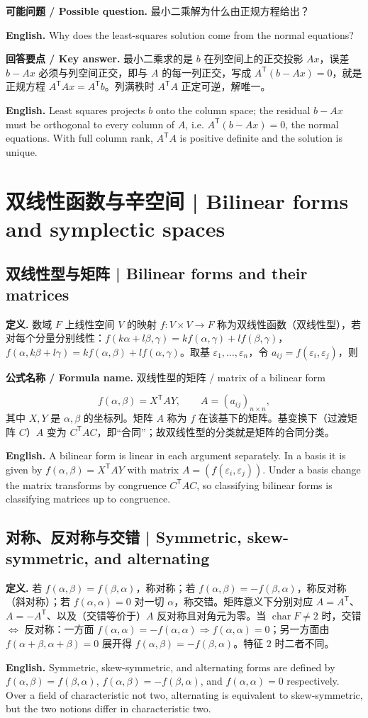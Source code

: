 \documentclass[UTF8,11pt,a4paper]{ctexart}
\newcommand{\EN}[1]{\par\noindent\textbf{English.} #1\par}
\newcommand{\FORMULA}[2]{\par\noindent\textbf{公式名称 / Formula name.} #1 / #2\par}
\newcommand{\ASK}[4]{\par\noindent\textbf{可能问题 / Possible question.} #1\par\EN{#2}\noindent\textbf{回答要点 / Key answer.} #3\par\EN{#4}\medskip}
\begin{document}
\ASK{最小二乘解为什么由正规方程给出？}{Why does the least-squares solution come from the normal equations?}{最小二乘求的是 $b$ 在列空间上的正交投影 $Ax$，误差 $b-Ax$ 必须与列空间正交，即与 $A$ 的每一列正交，写成 $A^{\mathsf T}(b-Ax)=0$，就是正规方程 $A^{\mathsf T}Ax=A^{\mathsf T}b$。列满秩时 $A^{\mathsf T}A$ 正定可逆，解唯一。}{Least squares projects $b$ onto the column space; the residual $b-Ax$ must be orthogonal to every column of $A$, i.e. $A^{\mathsf T}(b-Ax)=0$, the normal equations. With full column rank, $A^{\mathsf T}A$ is positive definite and the solution is unique.}

\section{双线性函数与辛空间 | Bilinear forms and symplectic spaces}
\subsection{双线性型与矩阵 | Bilinear forms and their matrices}
\noindent\textbf{定义.} 数域 $F$ 上线性空间 $V$ 的映射 $f:V\times V\to F$ 称为双线性函数（双线性型），若对每个分量分别线性：$f(k\alpha+l\beta,\gamma)=kf(\alpha,\gamma)+lf(\beta,\gamma)$，$f(\alpha,k\beta+l\gamma)=kf(\alpha,\beta)+lf(\alpha,\gamma)$。取基 $\varepsilon_1,\dots,\varepsilon_n$，令 $a_{ij}=f(\varepsilon_i,\varepsilon_j)$，则
\FORMULA{双线性型的矩阵}{matrix of a bilinear form}
\[
f(\alpha,\beta)=X^{\mathsf T}AY,\qquad A=(a_{ij})_{n\times n},
\]
其中 $X,Y$ 是 $\alpha,\beta$ 的坐标列。矩阵 $A$ 称为 $f$ 在该基下的矩阵。基变换下（过渡矩阵 $C$）$A$ 变为 $C^{\mathsf T}AC$，即“合同”；故双线性型的分类就是矩阵的合同分类。
\EN{A bilinear form is linear in each argument separately. In a basis it is given by $f(\alpha,\beta)=X^{\mathsf T}AY$ with matrix $A=(f(\varepsilon_i,\varepsilon_j))$. Under a basis change the matrix transforms by congruence $C^{\mathsf T}AC$, so classifying bilinear forms is classifying matrices up to congruence.}

\subsection{对称、反对称与交错 | Symmetric, skew-symmetric, and alternating}
\noindent\textbf{定义.} 若 $f(\alpha,\beta)=f(\beta,\alpha)$，称对称；若 $f(\alpha,\beta)=-f(\beta,\alpha)$，称反对称（斜对称）；若 $f(\alpha,\alpha)=0$ 对一切 $\alpha$，称交错。矩阵意义下分别对应 $A=A^{\mathsf T}$、$A=-A^{\mathsf T}$、以及（交错等价于）$A$ 反对称且对角元为零。当 $\operatorname{char}F\ne2$ 时，交错 $\iff$ 反对称：一方面 $f(\alpha,\alpha)=-f(\alpha,\alpha)\Rightarrow f(\alpha,\alpha)=0$；另一方面由 $f(\alpha+\beta,\alpha+\beta)=0$ 展开得 $f(\alpha,\beta)=-f(\beta,\alpha)$。特征 $2$ 时二者不同。
\EN{Symmetric, skew-symmetric, and alternating forms are defined by $f(\alpha,\beta)=f(\beta,\alpha)$, $f(\alpha,\beta)=-f(\beta,\alpha)$, and $f(\alpha,\alpha)=0$ respectively. Over a field of characteristic not two, alternating is equivalent to skew-symmetric, but the two notions differ in characteristic two.}
\end{document}
